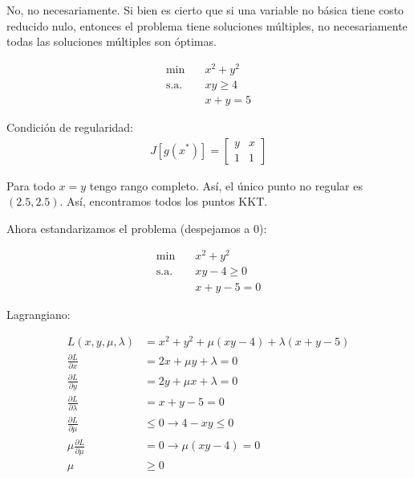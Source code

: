 \documentclass{article}
\newenvironment{question}
{\begin{mdframed}[backgroundcolor=white]}
{\end{mdframed}}
\newenvironment{solution}
{\begin{mdframed}[backgroundcolor=lightorange,hidealllines=true]}
{\end{mdframed}}
\begin{document}
\begin{solution}
    No, no necesariamente. Si bien es cierto que si una variable no básica tiene costo reducido nulo, entonces el problema tiene soluciones múltiples, no necesariamente todas las soluciones múltiples son óptimas.
\end{solution}

\begin{question}
    \begin{align*}
        \min \quad        & x^2+y^2  \\
        \text{s.a.} \quad & xy\geq 4 \\
                          & x+y=5
    \end{align*}
\end{question}

\begin{solution}
    Condición de regularidad:
    \begin{align*}
        J[g(x^*)] = \begin{bmatrix}
                        y & x \\
                        1 & 1
                    \end{bmatrix}
    \end{align*}

    Para todo $x=y$ tengo rango completo. Así, el único punto no regular es $(2.5,2.5)$. Así, encontramos todos los puntos KKT.

    Ahora estandarizamos el problema (despejamos a 0):

    \begin{align*}
        \min \quad        & x^2+y^2    \\
        \text{s.a.} \quad & xy-4\geq 0 \\
                          & x+y-5=0
    \end{align*}

    Lagrangiano:

    \begin{align*}
        L(x,y,\mu, \lambda)                 & = x^2+y^2 + \mu(xy-4) + \lambda(x+y-5) \\
        \frac{\partial L}{\partial x}       & = 2x + \mu y + \lambda = 0             \\
        \frac{\partial L}{\partial y}       & = 2y + \mu x + \lambda = 0             \\
        \frac{\partial L}{\partial \lambda} & = x + y - 5= 0                         \\
        \frac{\partial L}{\partial \mu}     & \leq 0 \to 4-xy \leq 0                 \\
        \mu\frac{\partial L}{\partial \mu}  & = 0 \to \mu(xy-4) = 0                  \\
        \mu                                 & \geq 0
    \end{align*}


\end{solution}
\end{document}
